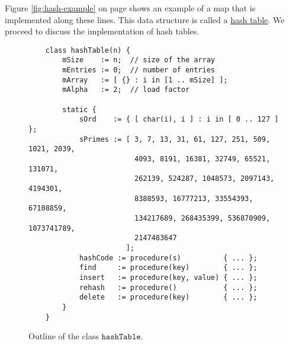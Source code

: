 Figure \ref{fig:hash-example} on page \pageref{fig:hash-example} shows an example of a map that is implemented
along these lines.  This data structure is called a \href{https://en.wikipedia.org/wiki/Hash_table}{hash table}.
We proceed to discuss the implementation of hash tables.



\begin{figure}[!ht]
  \centering
\begin{verbatim}
    class hashTable(n) {
        mSize    := n;  // size of the array 
        mEntries := 0;  // number of entries
        mArray   := [ {} : i in [1 .. mSize] ];
        mAlpha   := 2;  // load factor
    
        static {
            sOrd    := { [ char(i), i ] : i in [ 0 .. 127 ] };
            sPrimes := [ 3, 7, 13, 31, 61, 127, 251, 509, 1021, 2039, 
                         4093, 8191, 16381, 32749, 65521, 131071, 
                         262139, 524287, 1048573, 2097143, 4194301, 
                         8388593, 16777213, 33554393, 67108859, 
                         134217689, 268435399, 536870909, 1073741789, 
                         2147483647 
                       ];    
            hashCode := procedure(s)          { ... };
            find     := procedure(key)        { ... };
            insert   := procedure(key, value) { ... };
            rehash   := procedure()           { ... };
            delete   := procedure(key)        { ... };    
        }
    }
\end{verbatim}
\vspace*{-0.3cm}
  \caption{Outline of the class $\texttt{hashTable}$.}
  \label{fig:hashTable.ipython-outline}
\end{figure}

